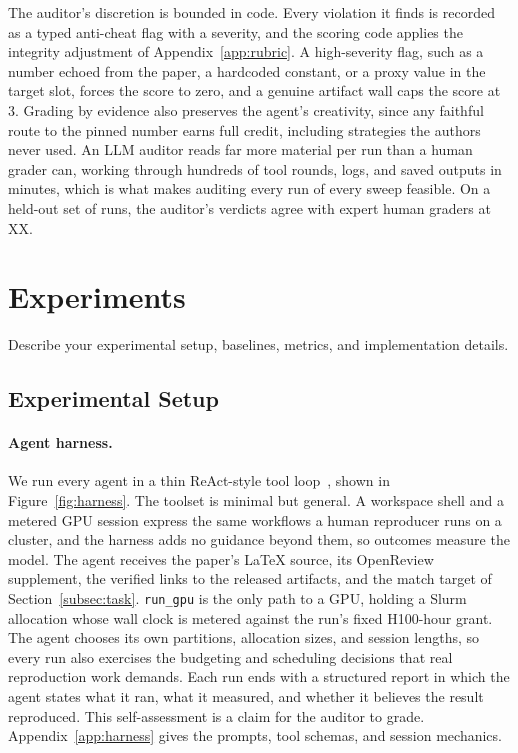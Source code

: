 \documentclass{article} %
\begin{document}
The auditor's discretion is bounded in code. Every violation it finds is
recorded as a typed anti-cheat flag with a severity, and the scoring code
applies the integrity adjustment of Appendix~\ref{app:rubric}. A
high-severity flag, such as a number echoed
from the paper, a hardcoded constant, or a proxy value in the target slot,
forces the score to zero, and a genuine artifact wall caps the score at 3.
Grading by evidence also preserves the agent's creativity, since any
faithful route to the pinned number earns full credit, including
strategies the authors never used. An
LLM auditor reads far more material per run than a human grader can,
working through hundreds of tool rounds, logs, and saved outputs in
minutes, which is what makes auditing every run of every sweep feasible.
On a held-out set of runs, the auditor's verdicts agree with expert human
graders at XX. %

\section{Experiments}
\label{sec:experiments}

Describe your experimental setup, baselines, metrics, and implementation details.

\subsection{Experimental Setup}
\label{subsec:experimental-setup}

\paragraph{Agent harness.} We run every agent in a thin ReAct-style tool
loop~\citep{yao2023react}, shown in Figure~\ref{fig:harness}. The toolset is
minimal but general. A workspace shell and a metered GPU session express the
same workflows a human reproducer runs on a cluster, and the harness adds no
guidance beyond them, so outcomes measure the model. The agent receives the paper's \LaTeX{} source, its OpenReview
supplement, the verified links to the released artifacts, and the match
target of Section~\ref{subsec:task}. \texttt{run\_gpu} is the only path to a
GPU, holding a Slurm allocation whose wall clock is metered against the
run's fixed H100-hour grant. The agent chooses its own partitions,
allocation sizes, and session lengths, so every run also exercises the
budgeting and scheduling decisions that real reproduction work demands.
Each run ends with a structured report in which the agent states what it
ran, what it measured, and whether it believes the result reproduced. This
self-assessment is a claim for the auditor to grade. Appendix~\ref{app:harness} gives the
prompts, tool schemas, and session mechanics.
\end{document}

